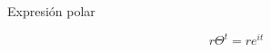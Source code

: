 \documentclass[preview]{standalone}
\begin{document}
\begin{center}
Expresión polar 


$$r\Theta^{t}=re^{i t}$$
\end{center}
\end{document}
